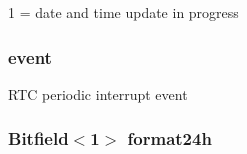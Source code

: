 1 = date and time update in progress \hypertarget{classMC146818_adb3e426cd9214d797472cddc46fd8b0a}{
\subsubsection[{event}]{ {\bf event}}}
\label{classMC146818_adb3e426cd9214d797472cddc46fd8b0a}
RTC periodic interrupt event \hypertarget{classMC146818_a570b614b6c947c1a65c60a8b5f0c37a6}{
\subsubsection[{format24h}]{\setlength{\rightskip}{0pt plus 5cm}Bitfield$<$1$>$ {\bf format24h}}}
\label{classMC146818_a570b614b6c947c1a65c60a8b5f0c37a6}


